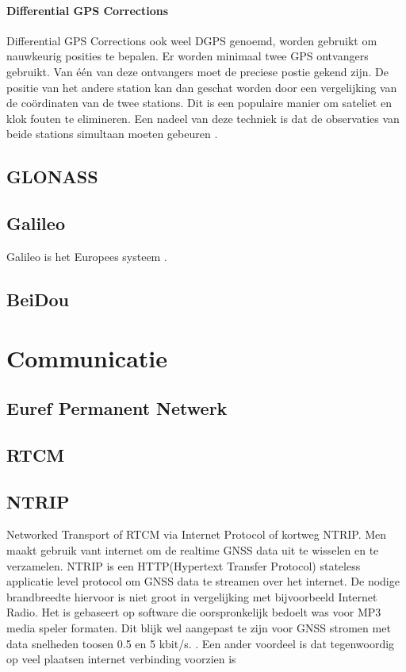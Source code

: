 \paragraph{Differential GPS Corrections}
Differential GPS Corrections ook weel DGPS genoemd, worden gebruikt om nauwkeurig posities  te bepalen. Er worden minimaal twee GPS ontvangers gebruikt. Van \'e\'en van deze ontvangers moet de preciese postie gekend zijn. De positie van het andere station kan dan geschat worden door een vergelijking van de co\"ordinaten van de twee stations. Dit is een populaire manier om sateliet en klok fouten te elimineren. Een nadeel van deze techniek is dat de observaties van beide stations simultaan moeten gebeuren \cite{LBibGNSS2}. 


\subsection{GLONASS}
\label{LGLO}

\subsection{Galileo}
\label{LGal}
Galileo is het Europees systeem \cite{LBibGNSS3}.

\subsection{BeiDou}
\label{LBeD}

\section{Communicatie}
\label{LCom}
\subsection{Euref Permanent Netwerk}

\subsection{RTCM}

\subsection{NTRIP}
\label{LNTR}
Networked Transport of RTCM via Internet Protocol of kortweg NTRIP. Men maakt gebruik vant internet om de realtime GNSS data uit te wisselen en te verzamelen. NTRIP is een HTTP(Hypertext Transfer Protocol) stateless applicatie level protocol om GNSS data te streamen over het internet. De nodige brandbreedte hiervoor is niet groot in vergelijking met bijvoorbeeld Internet Radio\cite{LBibNTRIP}. Het is gebaseert op software die oorspronkelijk bedoelt was voor MP3 media speler formaten. Dit blijk wel aangepast te zijn voor GNSS stromen met data snelheden toosen 0.5 en 5 kbit/s. \cite{LBibGPS}. Een ander voordeel is dat tegenwoordig op veel plaatsen internet verbinding voorzien is \cite{LBibNTRIP}

